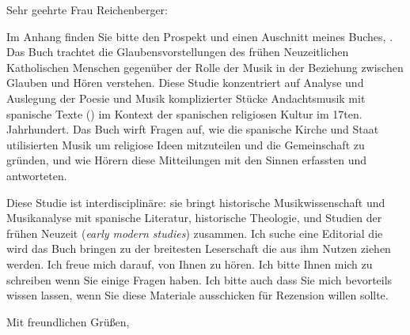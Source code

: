 \documentclass{letter-ur}
\begin{document}
Sehr geehrte Frau Reichenberger:

Im Anhang finden Sie bitte den Prospekt und einen Auschnitt meines Buches, 
.
Das Buch trachtet die Glaubensvorstellungen des frühen
Neuzeitlichen Katholischen Menschen gegenüber der Rolle der Musik in der
Beziehung zwischen Glauben und Hören verstehen.
Diese Studie konzentriert auf Analyse und Auslegung der Poesie und Musik
komplizierter Stücke Andachtsmusik mit spanische Texte () im
Kontext der spanischen religiosen Kultur im 17ten. Jahrhundert.
Das Buch wirft Fragen auf, wie die spanische Kirche und Staat utilisierten Musik
um religiose Ideen mitzuteilen und die Gemeinschaft zu gründen, und wie Hörern
diese Mitteilungen mit den Sinnen erfassten und antworteten.

Diese Studie ist interdisciplinäre: sie bringt historische Musikwissenschaft und
Musikanalyse mit spanische Literatur, historische Theologie, und Studien der
frühen Neuzeit (\emph{early modern studies}) zusammen.
Ich suche eine Editorial die wird das Buch bringen zu der breitesten Leserschaft die
aus ihm Nutzen ziehen werden.
Ich freue mich darauf, von Ihnen zu hören. 
Ich bitte Ihnen mich zu schreiben wenn Sie einige Fragen haben.
Ich bitte auch dass Sie mich bevorteils wissen lassen, wenn Sie diese
Materiale ausschicken für Rezension willen sollte.

Mit freundlichen Grüßen,
\end{document}
